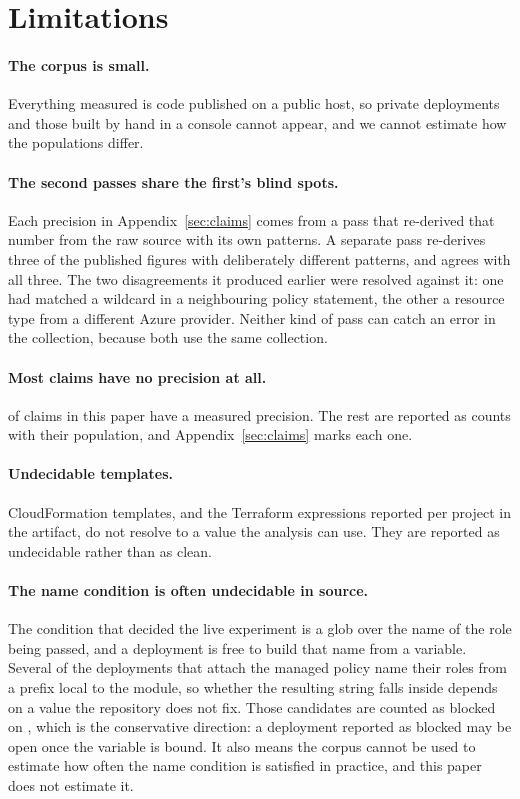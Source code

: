 \section{Limitations}
\label{sec:limitations}

\paragraph{The corpus is small.}
Everything measured is code published on a public host, so private deployments and those built by hand in a console cannot
appear, and we cannot estimate how the populations differ.

\paragraph{The second passes share the first's blind spots.}
Each precision in Appendix~\ref{sec:claims} comes from a pass that re-derived
that number from the raw source with its own patterns. A separate pass
re-derives three of the published figures with deliberately different
patterns, and agrees with all three. The two disagreements it produced
earlier were resolved against it: one had matched a wildcard in a
neighbouring policy statement, the other a resource type from a different
Azure provider. Neither kind of pass can catch an error in the collection,
because both use the same collection.

\paragraph{Most claims have no precision at all.}
\nClaimsWithPrecision of \nClaims claims in this paper have a measured
precision. The rest are reported as counts with their population, and
Appendix~\ref{sec:claims} marks each one.

\paragraph{Undecidable templates.}
\nCfnUndecidable CloudFormation templates, and the Terraform expressions
reported per project in the artifact, do not resolve to a value the analysis
can use. They are reported
as undecidable rather than as clean.

\paragraph{The name condition is often undecidable in source.}
The condition that decided the live experiment is a glob over the name of the
role being passed, and a deployment is free to build that name from a
variable. Several of the deployments that attach the managed policy name their
roles from a prefix local to the module, so whether the resulting string falls
inside  depends on a value the repository does not
fix. Those candidates are counted as blocked on , which is
the conservative direction: a deployment reported as blocked may be open once
the variable is bound. It also means the corpus cannot be used to estimate how
often the name condition is satisfied in practice, and this paper does not
estimate it.

